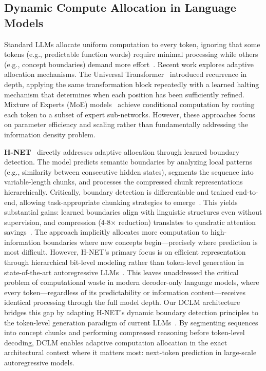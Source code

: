 \subsection{Dynamic Compute Allocation in Language Models}

Standard LLMs allocate uniform computation to every token, ignoring that some tokens (e.g., predictable function words) require minimal processing while others (e.g., concept boundaries) demand more effort~\cite{kaplan2020scaling, hoffmann2022training}. Recent work explores adaptive allocation mechanisms. The Universal Transformer~\cite{dehghani2018universal} introduced recurrence in depth, applying the same transformation block repeatedly with a learned halting mechanism that determines when each position has been sufficiently refined. Mixture of Experts (MoE) models~\cite{shazeer2017outrageously, jiang2024mixtral} achieve conditional computation by routing each token to a subset of expert sub-networks. However, these approaches focus on parameter efficiency and scaling rather than fundamentally addressing the information density problem.

\textbf{H-NET}~\cite{hwang2025dynamicchunkingendtoendhierarchical} directly addresses adaptive allocation through learned boundary detection. The model predicts semantic boundaries by analyzing local patterns (e.g., similarity between consecutive hidden states), segments the sequence into variable-length chunks, and processes the compressed chunk representations hierarchically. Critically, boundary detection is differentiable and trained end-to-end, allowing task-appropriate chunking strategies to emerge~\cite{hwang2025dynamicchunkingendtoendhierarchical}. This yields substantial gains: learned boundaries align with linguistic structures even without supervision, and compression (4-8× reduction) translates to quadratic attention savings~\cite{hwang2025dynamicchunkingendtoendhierarchical}. The approach implicitly allocates more computation to high-information boundaries where new concepts begin—precisely where prediction is most difficult. However, H-NET's primary focus is on efficient representation through hierarchical bit-level modeling rather than token-level generation in state-of-the-art autoregressive LLMs~\cite{hwang2025dynamicchunkingendtoendhierarchical}. This leaves unaddressed the critical problem of computational waste in modern decoder-only language models, where every token—regardless of its predictability or information content—receives identical processing through the full model depth. Our DCLM architecture bridges this gap by adapting H-NET's dynamic boundary detection principles to the token-level generation paradigm of current LLMs~\cite{brown2020language, touvron2023llama}. By segmenting sequences into concept chunks and performing compressed reasoning before token-level decoding, DCLM enables adaptive computation allocation in the exact architectural context where it matters most: next-token prediction in large-scale autoregressive models.